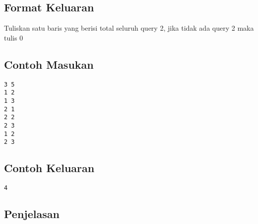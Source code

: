 \documentclass{article}
\begin{document}
\subsection*{Format Keluaran}
Tuliskan satu baris yang berisi total seluruh query 2, jika tidak ada query 2 maka tulis 0
\\

\begin{multicols}{2}
\subsection*{Contoh Masukan}
\begin{lstlisting}
3 5
1 2
1 3
2 1
2 2
2 3
1 2
2 3
\end{lstlisting}
\columnbreak
\subsection*{Contoh Keluaran}
\begin{lstlisting}
4
\end{lstlisting}
\vfill
\null
\end{multicols}

\subsection*{Penjelasan}
 

\pagebreak
\end{document}

